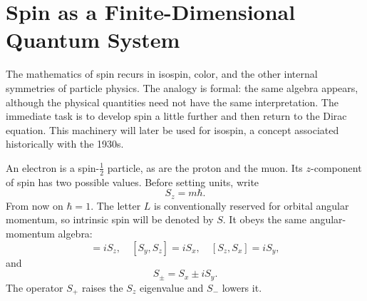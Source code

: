 \begin{classroomqa}
\end{classroomqa}

\section{Spin as a Finite-Dimensional Quantum System}

The mathematics of spin recurs in isospin, color, and the other internal symmetries of particle physics. The analogy is formal: the same algebra appears, although the physical quantities need not have the same interpretation. The immediate task is to develop spin a little further and then return to the Dirac equation. This machinery will later be used for isospin, a concept associated historically with the 1930s.

An electron is a spin-\(\tfrac12\) particle, as are the proton and the muon. Its \(z\)-component of spin has two possible values. Before setting units, write
\begin{equation}
S_z=m\hbar.
\end{equation}
From now on \(\hbar=1\). The letter \(L\) is conventionally reserved for orbital angular momentum, so intrinsic spin will be denoted by \(S\). It obeys the same angular-momentum algebra:
\begin{equation}
[S_x,S_y]=iS_z,
\quad
[S_y,S_z]=iS_x,
\quad
[S_z,S_x]=iS_y,
\end{equation}
and
\begin{equation}
S_\pm=S_x\pm iS_y.
\end{equation}
The operator \(S_+\) raises the \(S_z\) eigenvalue and \(S_-\) lowers it.

\begin{classroomqa}
\end{classroomqa}

